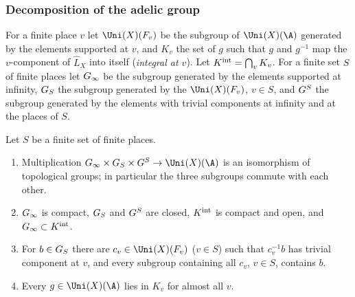 \subsubsection*{Decomposition of the adelic group}
For a finite place $v$ let $\Uni(X)(F_v)$ be the subgroup of $\Uni(X)(\A)$ generated by the elements supported
at $v$, and $K_v$ the set of $g$ such that $g$ and $g^{-1}$ map the $v$-component of $\widehat L_X$ into itself
(\emph{integral at $v$}). Let $K^{\mathrm{int}}=\bigcap_vK_v$. For a finite set $S$ of finite places let $G_\infty$ be
the subgroup generated by the elements supported at infinity, $G_S$ the subgroup generated by the
$\Uni(X)(F_v)$, $v\in S$, and $G^{S}$ the subgroup generated by the elements with trivial components at
infinity and at the places of $S$.

\begin{lemma}[Decomposition]\label{pf:tlift:decomp}
Let $S$ be a finite set of finite places.
\begin{enumerate}[label=(\alph*),nosep]
\item Multiplication $\tliftGinf\times\tliftGS\times\tliftGoff\to\Uni(X)(\A)$ is an isomorphism of topological groups;
  in particular the three subgroups commute with each other.
\item $G_\infty$ is compact, $G_S$ and $G^{S}$ are closed, $K^{\mathrm{int}}$ is compact and open, and
  $G_\infty\subset K^{\mathrm{int}}$.
\item For $b\in G_S$ there are $c_v\in\Uni(X)(F_v)$ ($v\in S$) such that $c_v^{-1}b$ has trivial component at $v$, and
  every subgroup containing all $c_v$, $v\in S$, contains $b$.
\item Every $g\in\Uni(X)(\A)$ lies in $K_v$ for almost all $v$.
\end{enumerate}
\end{lemma}

